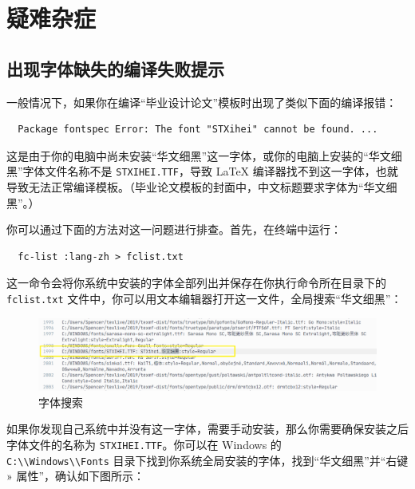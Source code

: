 \section{疑难杂症}

\subsection{出现字体缺失的编译失败提示}

一般情况下，如果你在编译“毕业设计论文”模板时出现了类似下面的编译报错：

\begin{verbatim}
  Package fontspec Error: The font "STXihei" cannot be found. ...
\end{verbatim}

这是由于你的电脑中尚未安装“华文细黑”这一字体，或你的电脑上安装的“华文细黑”字体文件名称不是 \texttt{STXIHEI.TTF}，导致 {\LaTeX} 编译器找不到这一字体，也就导致无法正常编译模板。（毕业论文模板的封面中，中文标题要求字体为“华文细黑”。）

你可以通过下面的方法对这一问题进行排查。首先，在终端中运行：

\begin{verbatim}
  fc-list :lang-zh > fclist.txt
\end{verbatim}

这一命令会将你系统中安装的字体全部列出并保存在你执行命令所在目录下的 \texttt{fclist.txt} 文件中，你可以用文本编辑器打开这一文件，全局搜索“华文细黑”：

\begin{figure}[H]
  \centering
  \includegraphics[width=\textwidth]{images/search_font.png}
  \caption{字体搜索}
  \label{search_font}
\end{figure}

如果你发现自己系统中并没有这一字体，需要手动安装，那么你需要确保安装之后字体文件的名称为 \texttt{STXIHEI.TTF}。你可以在 Windows 的\\ \texttt{C:\textbackslash\textbackslash Windows\textbackslash\textbackslash Fonts} 目录下找到你系统全局安装的字体，找到“华文细黑”并“右键 » 属性”，确认如下图所示：

